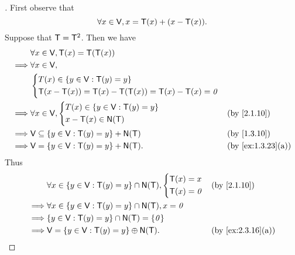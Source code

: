 \begin{proof}[]
  First observe that
  \[
    \forall x \in \mathsf{V}, x = \mathsf{T}(x) + (x - \mathsf{T}(x)).
  \]
  Suppose that \(\mathsf{T} = \mathsf{T}^2\).
  Then we have
  \begin{align*}
             & \forall x \in \V, \T(x) = \T(\T(x))                                                                                              \\
    \implies & \forall x \in \V,                                                                                                                \\
             & \begin{dcases}
                 T(x) \in \set{y \in \V : \T(y) = y} \\
                 \T(x - \T(x)) = \T(x) - \T(\T(x)) = \T(x) - \T(x) = \zv
               \end{dcases}                                       \\
    \implies & \forall x \in \V, \begin{dcases}
                                   T(x) \in \set{y \in \V : \T(y) = y} \\
                                   x - \T(x) \in \ns{\T}
                                 \end{dcases}                                                      &  & \text{(by \cref{2.1.10})}               \\
    \implies & \V \subseteq \set{y \in \V : \T(y) = y} + \ns{\T}                                           &  & \text{(by \cref{1.3.10})}       \\
    \implies & \V = \set{y \in \V : \T(y) = y} + \ns{\T}.                                                  &  & \text{(by \cref{ex:1.3.23}(a))}
  \end{align*}
  Thus
  \begin{align*}
             & \forall x \in \set{y \in \V : \T(y) = y} \cap \ns{\T}, \begin{dcases}
                                                                        \T(x) = x \\
                                                                        \T(x) = \zv
                                                                      \end{dcases} &  & \text{(by \cref{2.1.10})}         \\
    \implies & \forall x \in \set{y \in \V : \T(y) = y} \cap \ns{\T}, x = \zv                                             \\
    \implies & \set{y \in \V : \T(y) = y} \cap \ns{\T} = \set{\zv}                                                        \\
    \implies & \V = \set{y \in \V : \T(y) = y} \oplus \ns{\T}.                       &  & \text{(by \cref{ex:2.3.16}(a))}
  \end{align*}
\end{proof}

